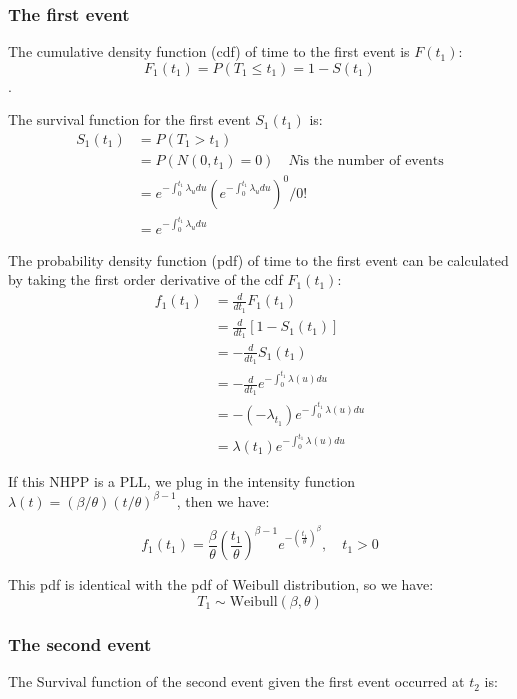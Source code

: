 \documentclass[12pt]{book}
\numberwithin{equation}{chapter}
\begin{document}
\hypertarget{the-first-event}{%
\subsubsection{The first event}\label{the-first-event}}

The cumulative density function (cdf) of time to the first event is \(F(t_1)\): \[F_1(t_1) = P(T_1 \leq t_1) = 1 - S(t_1)\].

The survival function for the first event \(S_1(t_1)\) is:
\begin{align*}
S_1(t_1) & = P(T_1 > t_1) \\
 & = P(N(0, t_1) = 0) \quad N \text{is the number of events}\\
 & = e^{-\int_{0}^{t_1}\lambda_{u}du}(e^{-\int_{0}^{t_1}\lambda_{u}du})^0/0!\\
 & = e^{-\int_{0}^{t_1}\lambda_{u}du}
\end{align*}

The probability density function (pdf) of time to the first event can be calculated by taking the first order derivative of the cdf \(F_1(t_1)\):
\begin{align*}
f_1(t_1) & = \frac{d}{dt_1}F_1(t_1)\\
& = \frac{d}{dt_1}[1 - S_1(t_1)] \\
& = - \frac{d}{dt_1}S_1(t_1)\\
& = - \frac{d}{dt_1}e^{-\int_{0}^{t_1}\lambda (u)du}\\
& = -(-\lambda_{t_1})e^{-\int_{0}^{t_1}\lambda (u)du}\\
& = \lambda (t_1)e^{-\int_{0}^{t_1}\lambda (u)du}
\end{align*}

If this NHPP is a PLL, we plug in the intensity function \(\lambda(t) = (\beta / \theta)(t/\theta)^{\beta - 1}\), then we have:

\[f_1(t_1) = \frac{\beta}{\theta}(\frac{t_1}{\theta})^{\beta - 1}e^{-(\frac{t_1}{\theta})^\beta}, \quad t_1 > 0\]

This pdf is identical with the pdf of Weibull distribution, so we have:
\[T_1 \sim \text{Weibull}(\beta, \theta)\]

\hypertarget{the-second-event}{%
\subsubsection{The second event}\label{the-second-event}}

The Survival function of the second event given the first event occurred at \(t_2\) is:
\end{document}
